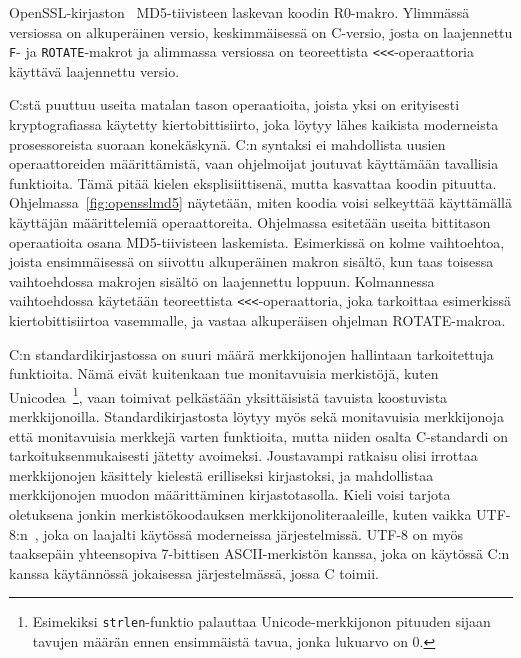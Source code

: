 \begin{listing}[ht!]
    \inputminted{C}{openssl_md5.c}

    \caption{OpenSSL-kirjaston~\citep{openssl} MD5-tiivisteen laskevan koodin
    R0-makro. Ylimmässä versiossa on alkuperäinen versio, keskimmäisessä on
    C-versio, josta on laajennettu \texttt{F}- ja \texttt{ROTATE}-makrot ja
    alimmassa versiossa on teoreettista \texttt{<<<}-operaattoria käyttävä
    laajennettu versio.}

    \label{fig:opensslmd5}
\end{listing}

C:stä puuttuu useita matalan tason operaatioita, joista yksi on erityisesti
kryptografiassa käytetty kiertobittisiirto, joka
löytyy lähes kaikista moderneista prosessoreista suoraan konekäskynä.
C:n syntaksi ei mahdollista uusien operaattoreiden määrittämistä, vaan
ohjelmoijat joutuvat käyttämään tavallisia funktioita. Tämä pitää kielen
eksplisiittisenä, mutta kasvattaa koodin pituutta.
Ohjelmassa~\ref{fig:opensslmd5} näytetään, miten koodia voisi selkeyttää
käyttämällä käyttäjän määrittelemiä operaattoreita. Ohjelmassa esitetään useita
bittitason operaatioita osana MD5-tiivisteen laskemista. Esimerkissä on kolme
vaihtoehtoa, joista ensimmäisessä on siivottu alkuperäinen makron sisältö, kun
taas toisessa vaihtoehdossa makrojen sisältö on laajennettu loppuun.
Kolmannessa vaihtoehdossa käytetään teoreettista \texttt{<<<}-operaattoria,
joka tarkoittaa esimerkissä kiertobittisiirtoa vasemmalle, ja vastaa
alkuperäisen ohjelman ROTATE-makroa.

C:n standardikirjastossa on suuri määrä merkkijonojen hallintaan tarkoitettuja
funktioita. Nämä eivät kuitenkaan tue monitavuisia merkistöjä, kuten Unicodea~\citep{unicode11}\footnote{Esimekiksi
\texttt{strlen}-funktio palauttaa Unicode-merkkijonon pituuden sijaan tavujen
määrän ennen ensimmäistä tavua, jonka lukuarvo on 0.}, vaan toimivat pelkästään
yksittäisistä tavuista koostuvista merkkijonoilla. Standardikirjastosta löytyy
myös sekä monitavuisia merkkijonoja että monitavuisia merkkejä varten
funktioita, mutta niiden osalta C-standardi on tarkoituksenmukaisesti jätetty
avoimeksi. Joustavampi ratkaisu olisi irrottaa merkkijonojen käsittely kielestä
erilliseksi kirjastoksi, ja mahdollistaa merkkijonojen muodon määrittäminen
kirjastotasolla. Kieli voisi tarjota oletuksena jonkin
merkistökoodauksen merkkijonoliteraaleille, kuten vaikka
UTF-8:n~\citep[s. 36]{unicode11}, joka on laajalti käytössä moderneissa
järjestelmissä. UTF-8 on myös taaksepäin yhteensopiva 7-bittisen
ASCII-merkistön kanssa, joka on käytössä C:n kanssa käytännössä jokaisessa
järjestelmässä, jossa C toimii.

